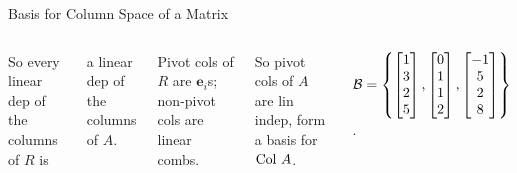 \documentclass[xcolor=dvipsnames,aspectratio=169,t]{beamer}
\begin{document}
\begin{frame}{Basis for Column Space of a Matrix}
\begin{columns}
\pause
So every linear dep of the columns of $R$ is 

a linear dep of the columns of $A$.
\smallskip

\pause
\alert{Pivot cols of $R$} are $\mathbf{e}_i$s; non-pivot cols are linear combs.
\smallskip

\pause
So \alert{pivot cols of $A$} are lin indep, form a basis for $\mbox{Col } A$.
\medskip

\qquad $\displaystyle \mathcal{B} = \left\{ \begin{bmatrix} 1 \\ 3 \\ 2 \\ 5 \end{bmatrix} , \begin{bmatrix} 0 \\ 1 \\ 1 \\ 2 \end{bmatrix}  ,  \begin{bmatrix} -1 \\ 5 \\ 2 \\ 8 \end{bmatrix} \right\}$.

\end{columns}

\end{frame}
\end{document}
